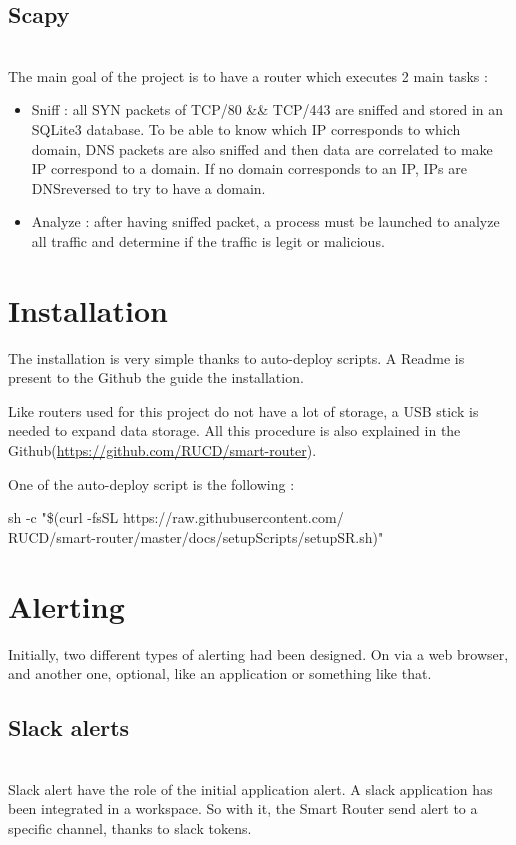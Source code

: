 \begin{frame}{}
\begin{multicols}{3}
\subsection{Scapy}\\
The main goal of the project is to have a router which executes 2 main tasks :
\begin{itemize}
  \item Sniff : all SYN packets of TCP/80 \&\& TCP/443 are sniffed and stored in an SQLite3 database. To be able to know which IP corresponds to which domain, DNS packets are also sniffed and then data are correlated to make IP correspond to a domain. If no domain corresponds to an IP, IPs are DNSreversed to try to have a domain. 
  \item Analyze : after having sniffed packet, a process must be launched to analyze all traffic and determine if the traffic is legit or malicious.
\end{itemize}




\section{Installation}
The installation is very simple thanks to auto-deploy scripts. A Readme is present to the Github the guide the installation. 

Like routers used for this project do not have a lot of storage, a USB stick is needed to expand data storage. All this procedure is also explained in the Github(\url{https://github.com/RUCD/smart-router}).


One of the auto-deploy script is the following :

sh -c "\$(curl -fsSL https://raw.githubusercontent.com/\\
RUCD/smart-router/master/docs/setupScripts/setupSR.sh)"


\section{Alerting}
Initially, two different types of alerting had been designed. On via a web browser, and another one, optional, like an application or something like that. 

\subsection{Slack alerts}\\
Slack alert have the role of the initial application alert. A slack application has been integrated in a workspace. So with it, the Smart Router send alert to a specific channel, thanks to slack tokens. 


\end{multicols}
\end{frame}
